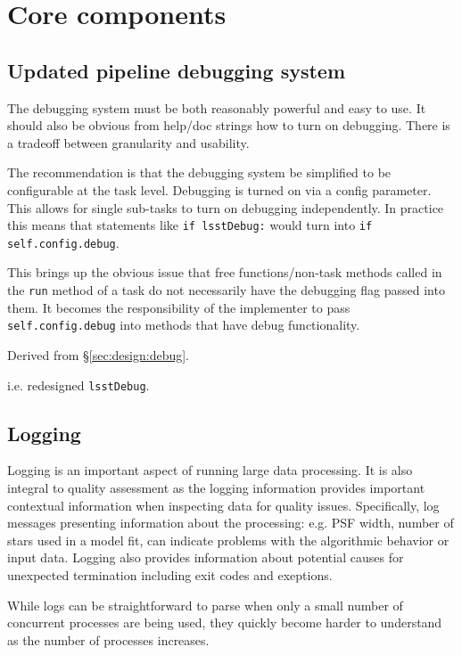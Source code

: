 \section{Core components}

\subsection{Updated pipeline debugging system}


The debugging system must be both reasonably powerful and easy to use.
It should also be obvious from help/doc strings how to turn on debugging.
There is a tradeoff between granularity and usability.

The recommendation is that the debugging system be simplified to be configurable at the task level.
Debugging is turned on via a config parameter.
This allows for single sub-tasks to turn on debugging independently.
In practice this means that statements like \texttt{if lsstDebug:} would turn into \texttt{if self.config.debug}.

This brings up the obvious issue that free functions/non-task methods called in the \texttt{run} method of a task do not necessarily have the debugging flag passed into them.
It becomes the responsibility of the implementer to pass \texttt{self.config.debug} into methods that have debug functionality.

Derived from \S\ref{sec:design:debug}.

i.e. redesigned \texttt{lsstDebug}.

\subsection{Logging}


Logging is an important aspect of running large data processing.
It is also integral to quality assessment as the logging information provides important contextual information when inspecting data for quality issues.
Specifically, log messages presenting information about the processing: e.g. PSF width, number of stars used in a model fit, can indicate problems with the algorithmic behavior or input data.
Logging also provides information about potential causes for unexpected termination including exit codes and exeptions.

While logs can be straightforward to parse when only a small number of concurrent processes are being used, they quickly become harder to understand as the number of processes increases.

